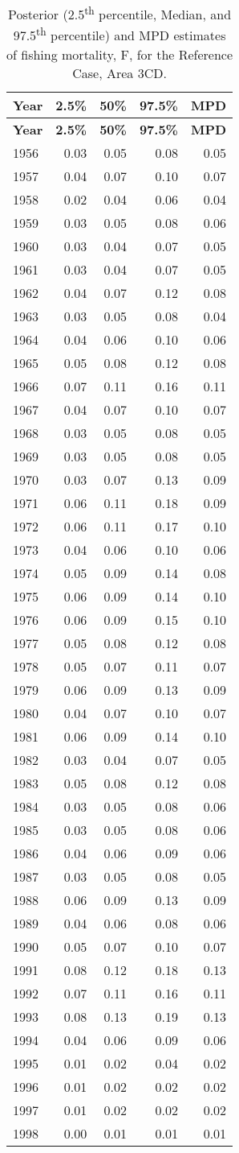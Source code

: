 \documentclass[11pt]{book}
\begin{document}
\begin{longtable}[]{@{}lrrrr@{}}
\caption{\label{tab:tab-post-f-3cd}Posterior (2.5\textsuperscript{th} percentile, Median, and 97.5\textsuperscript{th} percentile) and MPD estimates of fishing mortality, F, for the Reference Case, Area 3CD.}\tabularnewline
\toprule
\textbf{Year} & \textbf{2.5\%} & \textbf{50\%} & \textbf{97.5\%} & \textbf{MPD}\tabularnewline
\midrule
\endfirsthead
\toprule
\textbf{Year} & \textbf{2.5\%} & \textbf{50\%} & \textbf{97.5\%} & \textbf{MPD}\tabularnewline
\midrule
\endhead
1956 & 0.03 & 0.05 & 0.08 & 0.05\tabularnewline
1957 & 0.04 & 0.07 & 0.10 & 0.07\tabularnewline
1958 & 0.02 & 0.04 & 0.06 & 0.04\tabularnewline
1959 & 0.03 & 0.05 & 0.08 & 0.06\tabularnewline
1960 & 0.03 & 0.04 & 0.07 & 0.05\tabularnewline
1961 & 0.03 & 0.04 & 0.07 & 0.05\tabularnewline
1962 & 0.04 & 0.07 & 0.12 & 0.08\tabularnewline
1963 & 0.03 & 0.05 & 0.08 & 0.04\tabularnewline
1964 & 0.04 & 0.06 & 0.10 & 0.06\tabularnewline
1965 & 0.05 & 0.08 & 0.12 & 0.08\tabularnewline
1966 & 0.07 & 0.11 & 0.16 & 0.11\tabularnewline
1967 & 0.04 & 0.07 & 0.10 & 0.07\tabularnewline
1968 & 0.03 & 0.05 & 0.08 & 0.05\tabularnewline
1969 & 0.03 & 0.05 & 0.08 & 0.05\tabularnewline
1970 & 0.03 & 0.07 & 0.13 & 0.09\tabularnewline
1971 & 0.06 & 0.11 & 0.18 & 0.09\tabularnewline
1972 & 0.06 & 0.11 & 0.17 & 0.10\tabularnewline
1973 & 0.04 & 0.06 & 0.10 & 0.06\tabularnewline
1974 & 0.05 & 0.09 & 0.14 & 0.08\tabularnewline
1975 & 0.06 & 0.09 & 0.14 & 0.10\tabularnewline
1976 & 0.06 & 0.09 & 0.15 & 0.10\tabularnewline
1977 & 0.05 & 0.08 & 0.12 & 0.08\tabularnewline
1978 & 0.05 & 0.07 & 0.11 & 0.07\tabularnewline
1979 & 0.06 & 0.09 & 0.13 & 0.09\tabularnewline
1980 & 0.04 & 0.07 & 0.10 & 0.07\tabularnewline
1981 & 0.06 & 0.09 & 0.14 & 0.10\tabularnewline
1982 & 0.03 & 0.04 & 0.07 & 0.05\tabularnewline
1983 & 0.05 & 0.08 & 0.12 & 0.08\tabularnewline
1984 & 0.03 & 0.05 & 0.08 & 0.06\tabularnewline
1985 & 0.03 & 0.05 & 0.08 & 0.06\tabularnewline
1986 & 0.04 & 0.06 & 0.09 & 0.06\tabularnewline
1987 & 0.03 & 0.05 & 0.08 & 0.05\tabularnewline
1988 & 0.06 & 0.09 & 0.13 & 0.09\tabularnewline
1989 & 0.04 & 0.06 & 0.08 & 0.06\tabularnewline
1990 & 0.05 & 0.07 & 0.10 & 0.07\tabularnewline
1991 & 0.08 & 0.12 & 0.18 & 0.13\tabularnewline
1992 & 0.07 & 0.11 & 0.16 & 0.11\tabularnewline
1993 & 0.08 & 0.13 & 0.19 & 0.13\tabularnewline
1994 & 0.04 & 0.06 & 0.09 & 0.06\tabularnewline
1995 & 0.01 & 0.02 & 0.04 & 0.02\tabularnewline
1996 & 0.01 & 0.02 & 0.02 & 0.02\tabularnewline
1997 & 0.01 & 0.02 & 0.02 & 0.02\tabularnewline
1998 & 0.00 & 0.01 & 0.01 & 0.01\tabularnewline

\end{longtable}
\end{document}
